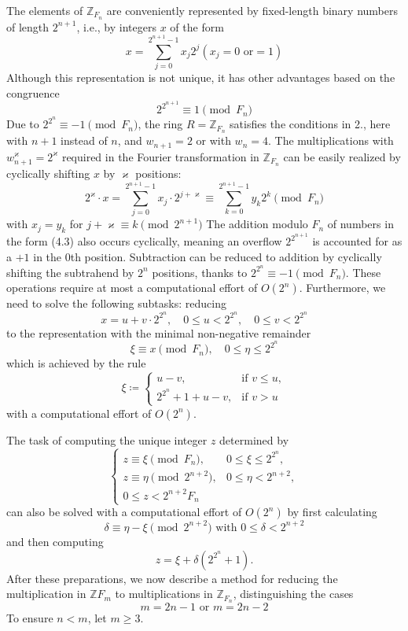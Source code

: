 \documentclass{article}
\begin{document}
The elements of $\mathbb{Z}_{F_n}$ are conveniently represented by fixed-length binary numbers of length $2^{n + 1}$, i.e., by integers $x$ of the form
\[
\tag{4.3}
x = \sum_{j = 0}^{2^{n + 1} - 1} x_j 2^j (x_j = 0\text{ or}= 1)
\]
Although this representation is not unique, it has other advantages based on the congruence
\[
\tag{4.4}
2^{2^{n + 1}} \equiv 1 \pmod{F_n}
\]
Due to $2^{2^n} \equiv -1 \pmod{F_n}$, the ring $R = \mathbb{Z}_{F_n}$ satisfies the conditions in 2., here with $n + 1$ instead of $n$, and $w_{n + 1} = 2$ or with $w_n = 4$. The multiplications with $w_{n + 1}^\varkappa = 2^\varkappa$ required in the Fourier transformation in $\mathbb{Z}_{F_n}$ can be easily realized by cyclically shifting $x$ by $\varkappa$ positions:
\[
2^\varkappa \cdot x = \sum_{j = 0}^{2^{n + 1} - 1} x_j \cdot 2^{j + \varkappa} \equiv \sum_{k = 0}^{2^{n + 1} - 1} y _k 2^k \pmod{F_n}
\] with $x_j = y_k$ for $j + \varkappa \equiv k \pmod {2^{n + 1}}$
The addition modulo $F_n$ of numbers in the form (4.3) also occurs cyclically, meaning an overflow $2^{2^{n + 1}}$ is accounted for as a $+1$ in the 0th position. Subtraction can be reduced to addition by cyclically shifting the subtrahend by $2^n$ positions, thanks to $2^{2^n} \equiv -1 \pmod{F_n}$. These operations require at most a computational effort of $O(2^n)$. Furthermore, we need to solve the following subtasks: reducing
\[
\tag{4.5}
x = u + v \cdot 2^{2^n}, \quad 0 \le u < 2^{2^n}, \quad 0 \le v < 2^{2^n}
\]
to the representation with the minimal non-negative remainder
\[
\xi \equiv x \pmod{F_n}, \quad 0 \le \eta \le 2^{2^n}
\]
which is achieved by the rule
\[
\tag{4.6}
\xi \coloneq
\begin{cases}
u - v, & \text{if }v \le u,\\
2^{2^n} + 1 + u - v, & \text{if }v > u
\end{cases}
\]
with a computational effort of $O(2^n)$.

The task of computing the unique integer $z$ determined by
\[
\tag{4.7}
\begin{cases}
z \equiv \xi \pmod{F_n}, & 0 \le \xi \le 2^{2^n}, \\
z \equiv \eta \pmod{2^{n + 2}}, & 0 \le \eta < 2^{n + 2}, \\
0 \le z < 2^{n + 2} F_n
\end{cases}
\]
can also be solved with a computational effort of $O(2^n)$ by first calculating
\[
\delta \equiv \eta - \xi \pmod{2^{n + 2}}\text{ with }0 \le \delta < 2^{n + 2}
\]
and then computing
\[
z = \xi + \delta\left(2^{2^n} + 1\right).
\]
After these preparations, we now describe a method for reducing the multiplication in $\mathbb{Z}{F_m}$ to multiplications in $\mathbb{Z}_{F_n}$, distinguishing the cases
\[
\tag{4.8}
m = 2n - 1\text{ or }m = 2n - 2
\]
To ensure $n < m$, let $m \ge 3$.
\end{document}
